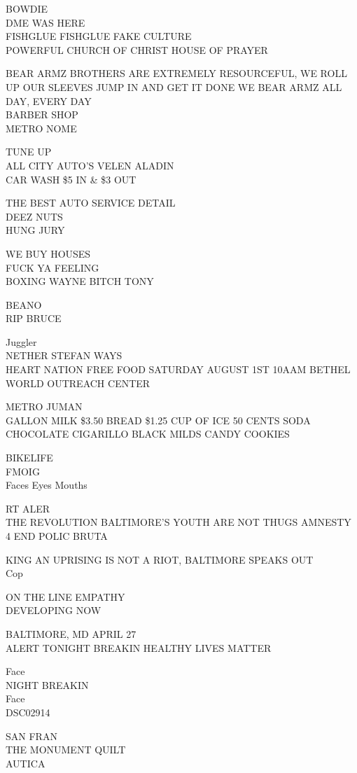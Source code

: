 \documentclass[10pt,letterpaper]{article}
\begin{document}
BOWDIE\\
DME WAS HERE\\
FISHGLUE FISHGLUE FAKE CULTURE\\
POWERFUL CHURCH OF CHRIST HOUSE OF PRAYER

BEAR ARMZ BROTHERS ARE EXTREMELY RESOURCEFUL, WE ROLL UP OUR SLEEVES JUMP IN AND GET IT DONE WE BEAR ARMZ ALL DAY, EVERY DAY\\
BARBER SHOP\\
METRO NOME

TUNE UP\\
ALL CITY AUTO'S VELEN ALADIN\\
CAR WASH \$5 IN \& \$3 OUT

THE BEST AUTO SERVICE DETAIL\\
DEEZ NUTS\\
HUNG JURY

WE BUY HOUSES\\
FUCK YA FEELING\\
BOXING WAYNE BITCH TONY

BEANO\\
RIP BRUCE

Juggler\\
NETHER STEFAN WAYS\\
HEART NATION FREE FOOD SATURDAY AUGUST 1ST 10AAM BETHEL WORLD OUTREACH CENTER

METRO JUMAN\\
GALLON MILK \$3.50 BREAD \$1.25 CUP OF ICE 50 CENTS SODA CHOCOLATE CIGARILLO BLACK MILDS CANDY COOKIES

BIKELIFE\\
FMOIG\\
Faces Eyes Mouths

RT ALER\\
THE REVOLUTION BALTIMORE'S YOUTH ARE NOT THUGS AMNESTY 4 END POLIC BRUTA

KING AN UPRISING IS NOT A RIOT, BALTIMORE SPEAKS OUT\\
Cop

ON THE LINE EMPATHY\\
DEVELOPING NOW

BALTIMORE, MD APRIL 27\\
ALERT TONIGHT BREAKIN HEALTHY LIVES MATTER

Face\\
NIGHT BREAKIN\\
Face\\
DSC02914

SAN FRAN\\
THE MONUMENT QUILT\\
AUTICA
\end{document}
